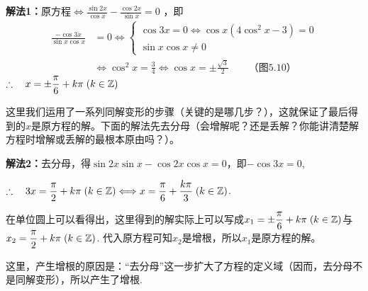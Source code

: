 \begin{solution}
\textbf{解法1：}原方程$\Longleftrightarrow \frac{\sin2x}{\cos x}-\frac{\cos 2x}{\sin x}=0$
，即
\[\begin{split}
\frac{-\cos 3x}{\sin x\cos x}&=0\Longleftrightarrow \begin{cases}
    \cos3x=0 \Leftrightarrow \cos x(4\cos^2 x-3)=0\\
    \sin x\cos x\ne 0   
\end{cases} 
\\
&\Longleftrightarrow \cos^2 x=\frac{3}{4}\Longleftrightarrow \cos x=\pm\frac{\sqrt{3}}{2} \qquad \text{（图5.10）}
\end{split} \]
$\therefore\quad x=\pm\dfrac{\pi}{6}+k\pi\; (k\in\mathbb{Z})$

\noindent
\begin{minipage}{.45\textwidth}
    \centering
{}
\end{minipage}
\hfill
\begin{minipage}{.45\textwidth}
\begin{remark}
这里我们运用了一系列同解变形的步骤（关键的是哪几步？），这就保证了最后得到的$x$是原方程的解。下面的解法先去分母（会增解呢？还是丢解？你能讲清楚解方程时增解或丢解的最根本原由吗？）。
\end{remark}
\end{minipage}

\textbf{解法2：}去分母，得$\sin2x\sin x-\cos2x\cos x=0$，即$-\cos3x=0$,

$\therefore\quad 3x=\dfrac{\pi}{2}+k\pi\; (k\in\mathbb{Z})\Longleftrightarrow x=\dfrac{\pi}{6}+\dfrac{k\pi}{3}\; (k\in\mathbb{Z})$.

在单位圆上可以看得出，这里得到的解实际上可以写成$x_1=\pm\dfrac{\pi}{6}+k\pi\; (k\in\mathbb{Z} )$与$x_2=\dfrac{\pi}{2}+k\pi\; (k\in\mathbb{Z} )$. 代入原方程可知$x_2$是增根，所以$x_1$是原方程的解。

\begin{remark}
    这里，产生增根的原因是：“去分母”这一步扩大了方程的定义域（因而，去分母不是同解变形），所以产生了增根.
\end{remark}
\end{solution}

